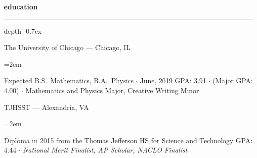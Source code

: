 \documentclass[12pt]{scrartcl}
\newcommand{\Description}[1]{\hangindent=2em\hangafter=0\noindent\raggedright\footnotesize{#1}\par\normalsize\vspace{0.5em}} %
\def\vhrulefill{\leavevmode\leaders\hrule height 0.7ex depth \dimexpr0.4pt-0.7ex\hfill\kern0pt}
\begin{document}
\date{}

\thispagestyle{empty} %



\begin{cv}{}\vspace{1.5em} %


\noindent
\begin{minipage}[t]{.6\textwidth}

\noindent\textbf{education} \hspace{1ex} \vhrulefill \vspace{0.5em} 

{\footnotesize\noindent
The University of Chicago --- Chicago, IL}

\Description{Expected B.S.\ Mathematics, B.A.\ Physics $\cdotp$ June, 2019\newline
GPA: 3.91 $\cdotp$ (Major GPA: 4.00) $\cdotp$ Mathematics and Physics Major, Creative Writing Minor
}

{\footnotesize\noindent
TJHSST --- Alexandria, VA}

\Description{Diploma in 2015 from the Thomas Jefferson HS for Science and Technology\newline
GPA: 4.44 $\cdotp$ \textit{National Merit Finalist, AP Scholar, NACLO Finalist}
}

\end{minipage}\hspace{1em}%
\begin{minipage}[t]{.35\textwidth}



\end{minipage}
\end{cv}
\end{document}
